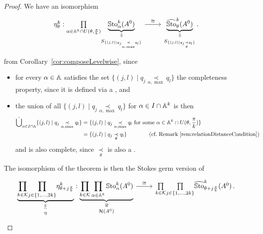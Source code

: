 \begin{proof}
  We have an isomorphism
  \[ \begin{tikzcd}
    \eta_\theta^k:
    \underset{\alpha\in\A^k\cap U(\theta,\frac{\pi}{k})}\prod
    \underset{S_{\{(j,l)\mid q_j\underset{\alpha,\max}{\prec}q_l\}}}{%
      \underset{\text{\rotatebox[origin=c]{-90}{$=$}}}{\underbrace{%
          \SSto_\alpha^k(A^0)}}}
    \rar{\cong}&
    \underset{S_{\{(j,l) \mid q_j \underset{\theta}{\prec} q_l \}}}{%
      \underset{\text{\rotatebox[origin=c]{-90}{$=$}}}{\underbrace{%
          \hat\SSto_\theta^k(A^0)}}}
    \,.
  \end{tikzcd} \]
  from Corollary~\ref{cor:composeLevelwise}, since
  \begin{itemize}
    \item for every $\alpha\in\mathbb{A}$ satisfies the set
      $\{(j,l)\mid q_j\underset{\alpha,\max}{\prec}q_l\}$ the completeness
      property, since it is defined via a , and
    \item the union of all $\{(j,l)\mid q_j\underset{\alpha,\max}{\prec}q_l\}$
      for $\alpha\in I\cap\mathbb{A}^k$ is then
      \begin{align*}
        \dot\bigcup_{\alpha\in I\cap\mathbb{A}}
          \{(j,l)\mid q_j\underset{\alpha,\max}{\prec}q_l\}
          &=\{(j,l) \mid q_j \underset{\alpha,\max}{\prec} q_l
            \text{~for some~}\alpha\in\mathbb{A}^k\cap U(\theta,\frac{\pi}{k}) \}
        \\&= \{(j,l) \mid q_j \underset{\theta}{\prec} q_l \}
          \qquad\qquad\text{(cf.\ Remark~\ref{rem:relationDistanceCondition})}
      \end{align*}
      and is also complete, since $\underset{\theta}{\prec}$ is also a
      .
  \end{itemize}
  The isomorphism of the theorem is then the Stokes germ version of
  \[ \begin{tikzcd}
    \underset{\eta}{%
      \underset{\text{\rotatebox[origin=c]{90}{$:=$}}}{\underbrace{%
        \underset{k\in\cK}{\prod}\underset{j\in\{1,\dots,2k\}}{\prod}
        \eta_{\theta+j\frac{\pi}{k}}^k
    }}}:
    \underset{\cH(A^0)}{%
      \underset{\text{\rotatebox[origin=c]{-90}{$\cong$}}}{\underbrace{%
        \prod_{k\in\cK}\prod_{\alpha\in\A^k}\SSto_\alpha^k(A^0)}}}
    \rar{\cong}&
    \underset{k\in\cK}{\prod}\underset{j\in\{1,\dots,2k\}}{\prod}
    \hat\SSto_{\theta+j\frac{\pi}{k}}^k(A^0) \,.
  \end{tikzcd} \]
\end{proof}

